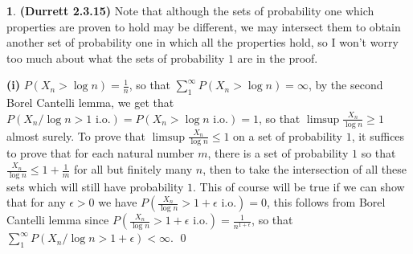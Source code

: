 \documentclass[10.5pt]{article}
\theoremstyle{definition}
\newtheorem{pb}{}
\begin{document}
    \begin{pb}\textbf{(Durrett 2.3.15)}
        Note that although the sets of probability one which properties are proven to hold may be different, we may intersect them to obtain another set of probability one in which all the properties hold, so I won't worry too much about what the sets of probability \(1\) are in the proof.

        \textbf{(i)} \(P(X_n > \log n) = \frac{1}{n}\), so that \(\sum_1^\infty P(X_n > \log n) = \infty\), by the second Borel Cantelli lemma, we get that \(P(X_n/\log n > 1 \text{ i.o.}) = P(X_n > \log n \text{ i.o.}) = 1\), so that \(\limsup \frac{X_n}{\log n} \geq 1\) almost surely. To prove that \(\limsup \frac{X_n}{\log n} \leq 1\) on a set of probability \(1\), it suffices to prove that for each natural number \(m\), there is a set of probability \(1\) so that \(\frac{X_n}{\log n} \leq 1 + \frac{1}{m}\) for all but finitely many \(n\), then to take the intersection of all these sets which will still have probability \(1\). This of course will be true if we can show that for any \(\epsilon > 0\) we have \(P(\frac{X_n}{\log n} > 1 + \epsilon \text{ i.o.}) = 0\), this follows from Borel Cantelli lemma since \(P(\frac{X_n}{\log n} > 1 + \epsilon \text{ i.o.}) = \frac{1}{n^{1 + \epsilon}}\), so that \(\sum_1^\infty P(X_n/\log n > 1 + \epsilon) < \infty\). \qed


\end{pb}
\end{document}
